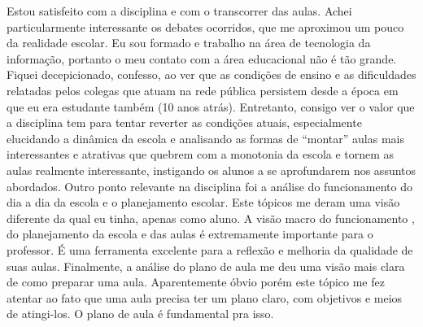 \documentclass[a4paper,12pt]{article}
\begin{document}
Estou satisfeito com a disciplina e com o transcorrer das aulas.
Achei particularmente interessante os debates ocorridos, que me aproximou um pouco da realidade escolar. Eu sou formado e trabalho na área de tecnologia da informação, portanto o meu contato com a área educacional não é tão grande.
Fiquei decepicionado, confesso, ao ver que as condições de ensino e as dificuldades relatadas pelos colegas que atuam na rede pública persistem desde a época em que eu era estudante também (10 anos atrás). Entretanto, consigo ver o valor que a disciplina tem para tentar reverter as condições atuais, especialmente elucidando a dinâmica da escola e analisando as formas de ``montar'' aulas mais interessantes e atrativas que quebrem com a monotonia da escola e tornem as aulas realmente interessante, instigando os alunos a se aprofundarem nos assuntos abordados.
Outro ponto relevante na disciplina foi a análise do funcionamento do dia a dia da escola e o planejamento escolar. Este tópicos me deram uma visão diferente da qual eu tinha, apenas como aluno. A visão macro do funcionamento , do planejamento da escola e das aulas é extremamente importante para o professor. É  uma ferramenta excelente para a reflexão e melhoria da qualidade de suas aulas.
Finalmente, a análise do plano de aula me deu uma visão mais clara de como preparar uma aula. Aparentemente óbvio porém este tópico me fez atentar ao fato que uma aula precisa ter um plano claro, com objetivos e meios de atingi-los. O plano de aula é fundamental pra isso.
\end{document}

